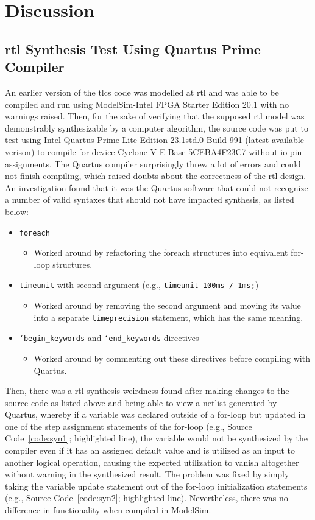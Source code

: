 \section{Discussion}
\subsection{\acs{rtl} Synthesis Test Using Quartus Prime Compiler}
An earlier version of the \ac{tlcs} code was modelled at \ac{rtl} and was able to be compiled and run using ModelSim-Intel FPGA Starter Edition 20.1 with no warnings raised. Then, for the sake of verifying that the supposed \ac{rtl} model was demonstrably synthesizable by a computer algorithm, the source code was put to test using Intel Quartus Prime Lite Edition 23.1std.0 Build 991 (latest available verison) to compile for device Cyclone V E Base 5CEBA4F23C7 without \ac{io} pin assignments. The Quartus compiler surprisingly threw a lot of errors and could not finish compiling, which raised doubts about the correctness of the \ac{rtl} design. An investigation found that it was the Quartus software that could not recognize a number of valid syntaxes that should not have impacted synthesis, as listed below:
\begin{itemize}
	\item \texttt{foreach}
	      \begin{itemize}
		      \item Worked around by refactoring the foreach structures into equivalent for-loop structures.
	      \end{itemize}
	\item \texttt{timeunit} with second argument (e.g., \texttt{timeunit 100ms \underline{/ 1ms};})
	      \begin{itemize}
		      \item Worked around by removing the second argument and moving its value into a separate \texttt{timeprecision} statement, which has the same meaning.
	      \end{itemize}
	\item \texttt{`begin\_keywords} and \texttt{`end\_keywords} directives
	      \begin{itemize}
		      \item Worked around by commenting out these directives before compiling with Quartus.
	      \end{itemize}
\end{itemize}
Then, there was a \ac{rtl} synthesis weirdness found after making changes to the source code as listed above and being able to view a netlist generated by Quartus, whereby if a variable was declared outside of a for-loop but updated in one of the step assignment statements of the for-loop (e.g., Source Code~\ref{code:syn1}; highlighted line), the variable would not be synthesized by the compiler even if it has an assigned default value and is utilized as an input to another logical operation, causing the expected utilization to vanish altogether without warning in the synthesized result. The problem was fixed by simply taking the variable update statement out of the for-loop initialization statements (e.g., Source Code~\ref{code:syn2}; highlighted line). Nevertheless, there was no difference in functionality when compiled in ModelSim.
